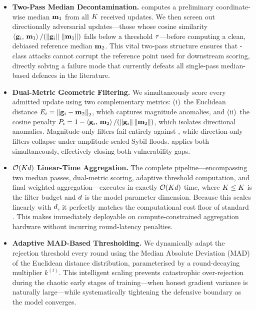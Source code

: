 \documentclass[../main.tex]{subfiles}
\begin{document}
\begin{itemize}

    \item \textbf{Two-Pass Median Decontamination.}
    \aegis{} computes a preliminary coordinate-wise median $\mathbf{m}_{1}$ from all $K$ received updates. We then screen out directionally adversarial updates---those whose cosine similarity $\left\langle \mathbf{g}_{i},\, \mathbf{m}_{1} \right\rangle/(\left\lVert \mathbf{g}_{i} \right\rVert\,\left\lVert \mathbf{m}_{1} \right\rVert)$ falls below a threshold $\tau$---before computing a clean, debiased reference median $\mathbf{m}_{2}$. This vital two-pass structure ensures that \ipm{}-class attacks cannot corrupt the reference point used for downstream scoring, directly solving a failure mode that currently defeats all single-pass median-based defences in the literature.

    \item \textbf{Dual-Metric Geometric Filtering.}
    We simultaneously score every admitted update using two complementary metrics: (i)~the Euclidean distance $E_i = \left\lVert \mathbf{g}_{i} - \mathbf{m}_{2} \right\rVert_2$, which captures magnitude anomalies, and (ii)~the cosine penalty $P_i = 1 - \left\langle \mathbf{g}_{i},\, \mathbf{m}_{2} \right\rangle/(\left\lVert \mathbf{g}_{i} \right\rVert\left\lVert \mathbf{m}_{2} \right\rVert)$, which isolates directional anomalies. Magnitude-only filters fail entirely against \ipm{}, while direction-only filters collapse under amplitude-scaled Sybil floods. \aegis{} applies both simultaneously, effectively closing both vulnerability gaps.

    \item \textbf{$\mathcal{O}\!\left(Kd\right)$ Linear-Time Aggregation.}
    The complete \aegis{} pipeline---encompassing two median passes, dual-metric scoring, adaptive threshold computation, and final weighted aggregation---executes in exactly $\mathcal{O}\!\left(Kd\right)$ time, where $K \leq K$ is the filter budget and $d$ is the model parameter dimension. Because this scales linearly with $d$, it perfectly matches the computational cost floor of standard \fedavg{}. This makes \aegis{} immediately deployable on compute-constrained aggregation hardware without incurring round-latency penalties.

    \item \textbf{Adaptive MAD-Based Thresholding.}
    We dynamically adapt the rejection threshold every round using the Median Absolute Deviation (MAD) of the Euclidean distance distribution, parameterised by a round-decaying multiplier $k^{(t)}$. This intelligent scaling prevents catastrophic over-rejection during the chaotic early stages of training---when honest gradient variance is naturally large---while systematically tightening the defensive boundary as the model converges.


\end{itemize}
\end{document}
